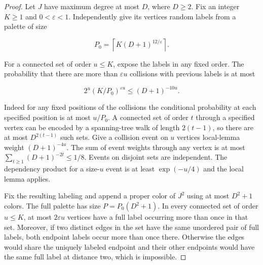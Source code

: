 \documentclass[11pt]{amsart}
\theoremstyle{definition}
\theoremstyle{remark}
\numberwithin{equation}{section}
\begin{document}
\begin{proof}

Let $J $ have maximum degree at most $ D $, where $ D\ge2$. Fix an integer $ K\ge1$ and $0<\varepsilon<1$. Independently give its vertices random labels from a palette of size

\begin{equation}
P_0=\left\lceil K(D+1)^{12/\varepsilon}\right\rceil .
\end{equation}

For a connected set of order $u\le K $, expose the labels in any fixed order. The probability that there are more than $\varepsilon u$ collisions with previous labels is at most

\begin{equation}
2^u (K/P_0)^{\varepsilon u}\le (D+1)^{-10u}.
\end{equation}

Indeed for any fixed positions of the collisions the conditional probability at each specified position is at most $u/P_0$. A connected set of order $ t $ through a specified vertex can be encoded by a spanning-tree walk of length $2(t-1)$, so there are at most $ D^{2(t-1)}$ such sets. Give a collision event on $ u $ vertices local-lemma weight $(D+1)^{-4u}$. The sum of event weights through any vertex is at most $\sum_{t\ge1}(D+1)^{-2t}\le1/8$. Events on disjoint sets are independent. The dependency product for a size-$ u $ event is at least $\exp(-u/4)$ and the local lemma applies.

Fix the resulting labeling and append a proper color of $J^2$ using at most $ D^2+1$ colors. The full palette has size $ P=P_0(D^2+1)$. In every connected set of order $ u\le K $, at most $2\varepsilon u$ vertices have a full label occurring more than once in that set. Moreover, if two distinct edges in the set have the same unordered pair of full labels, both endpoint labels occur more than once there. Otherwise the edges would share the uniquely labeled endpoint and their other endpoints would have the same full label at distance two, which is impossible.

\end{proof}
\end{document}
